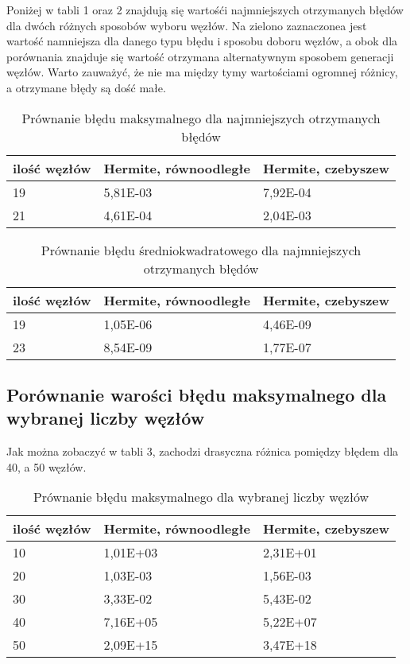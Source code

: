 \documentclass{article}
\begin{document}
Poniżej w tabli 1 oraz 2 znajdują się wartośći najmniejszych otrzymanych błędów dla dwóch różnych sposobów wyboru węzłów. Na zielono zaznaczonea jest wartość namniejsza dla danego typu błędu i sposobu doboru węzłów, a obok dla porównania znajduje się wartość otrzymana alternatywnym sposobem generacji węzłów. Warto zauważyć, że nie ma między tymy wartościami ogromnej różnicy, a otrzymane błędy są dość małe.

\begin{table}[!ht]
    \centering
    \begin{tabular}{|l|l|l|}
    \hline
        ilość węzłów & Hermite, równoodległe & Hermite, czebyszew  \\ \hline
        19 & 5,81E-03 & \textcolor{mategreen}{7,92E-04}  \\ \hline
        21 &  \textcolor{mategreen}{4,61E-04} & 2,04E-03 \\ \hline
    \end{tabular}
    \caption{Prównanie błędu maksymalnego dla najmniejszych otrzymanych błędów}
\end{table}

\begin{table}[!ht]
    \centering
    \begin{tabular}{|l|l|l|}
    \hline
        ilość węzłów & Hermite, równoodległe & Hermite, czebyszew  \\ \hline
        19 & 1,05E-06 & \textcolor{mategreen}{4,46E-09}  \\ \hline
        23 & \textcolor{mategreen}{8,54E-09} & 1,77E-07 \\ \hline
    \end{tabular}
    \caption{Prównanie błędu średniokwadratowego dla najmniejszych otrzymanych błędów}
\end{table}

\subsection{Porównanie warości błędu maksymalnego dla wybranej liczby węzłów}

Jak można zobaczyć w tabli 3, zachodzi drasyczna różnica pomiędzy błędem dla 40, a 50 węzłów. 

\begin{table}[!ht]
    \centering
    \begin{tabular}{|l|l|l|}
    \hline
        ilość węzłów & Hermite, równoodległe & Hermite, czebyszew  \\ \hline
        10 & 1,01E+03 & 2,31E+01  \\ \hline
        20 & 1,03E-03 & 1,56E-03  \\ \hline
        30 & 3,33E-02 & 5,43E-02  \\ \hline
        40 & 7,16E+05 & 5,22E+07  \\ \hline
        50 & 2,09E+15 & 3,47E+18 \\ \hline
    \end{tabular}
    \caption{Prównanie błędu maksymalnego dla wybranej liczby węzłów}
\end{table}
\end{document}
